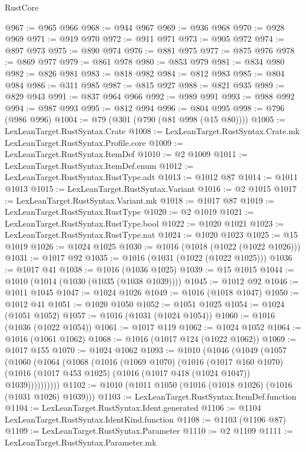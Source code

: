 \begin{lexlean}{RustCore}
\begin{coremodule}
@967 := @965 @966
@968 := @944 @967
@969 := @936 @968
@970 := @928 @969
@971 := @919 @970
@972 := @911 @971
@973 := @905 @972
@974 := @897 @973
@975 := @890 @974
@976 := @881 @975
@977 := @875 @976
@978 := @869 @977
@979 := @861 @978
@980 := @853 @979
@981 := @834 @980
@982 := @826 @981
@983 := @818 @982
@984 := @812 @983
@985 := @804 @984
@986 := @311 @985
@987 := @815 @927
@988 := @821 @935
@989 := @829 @943
@991 := @837 @964 @966
@992 := @989 @991
@993 := @988 @992
@994 := @987 @993
@995 := @812 @994
@996 := @804 @995
@998 := @796 (@986 @996)
@1004 := @79 (@301 (@790 (@81 @998 (@15 @80))))
@1005 := LexLeanTarget.RustSyntax.Crate
@1008 := LexLeanTarget.RustSyntax.Crate.mk LexLeanTarget.RustSyntax.Profile.core
@1009 := LexLeanTarget.RustSyntax.ItemDef
@1010 := @2 @1009
@1011 := LexLeanTarget.RustSyntax.ItemDef.enum
@1012 := LexLeanTarget.RustSyntax.RustType.adt
@1013 := @1012 @87
@1014 := @1011 @1013
@1015 := LexLeanTarget.RustSyntax.Variant
@1016 := @2 @1015
@1017 := LexLeanTarget.RustSyntax.Variant.mk
@1018 := @1017 @87
@1019 := LexLeanTarget.RustSyntax.RustType
@1020 := @2 @1019
@1021 := LexLeanTarget.RustSyntax.RustType.bool
@1022 := @1020 @1021
@1023 := LexLeanTarget.RustSyntax.RustType.nat
@1024 := @1020 @1023
@1025 := @15 @1019
@1026 := @1024 @1025
@1030 := @1016 (@1018 (@1022 (@1022 @1026)))
@1031 := @1017 @92
@1035 := @1016 (@1031 (@1022 (@1022 @1025)))
@1036 := @1017 @41
@1038 := @1016 (@1036 @1025)
@1039 := @15 @1015
@1044 := @1010 (@1014 (@1030 (@1035 (@1038 @1039))))
@1045 := @1012 @92
@1046 := @1011 @1045
@1047 := @1024 @1026
@1049 := @1016 (@1018 @1047)
@1050 := @1012 @41
@1051 := @1020 @1050
@1052 := @1051 @1025
@1054 := @1024 (@1051 @1052)
@1057 := @1016 (@1031 (@1024 @1054))
@1060 := @1016 (@1036 (@1022 @1054))
@1061 := @1017 @119
@1062 := @1024 @1052
@1064 := @1016 (@1061 @1062)
@1068 := @1016 (@1017 @124 (@1022 @1062))
@1069 := @1017 @155
@1070 := @1024 @1062
@1093 := @1010
    (@1046
      (@1049
        (@1057
          (@1060
            (@1064
              (@1068
                (@1016
                  (@1069 @1070)
                  (@1016
                    (@1017 @160 @1070)
                    (@1016 (@1017 @453 @1025) (@1016 (@1017 @418 (@1024 @1047)) @1039))))))))))
@1102 := @1010 (@1011 @1050 (@1016 (@1018 @1026) (@1016 (@1031 @1026) @1039)))
@1103 := LexLeanTarget.RustSyntax.ItemDef.function
@1104 := LexLeanTarget.RustSyntax.Ident.generated
@1106 := @1104 LexLeanTarget.RustSyntax.IdentKind.function
@1108 := @1103 (@1106 @87)
@1109 := LexLeanTarget.RustSyntax.Parameter
@1110 := @2 @1109
@1111 := LexLeanTarget.RustSyntax.Parameter.mk

\end{coremodule}
\end{lexlean}
